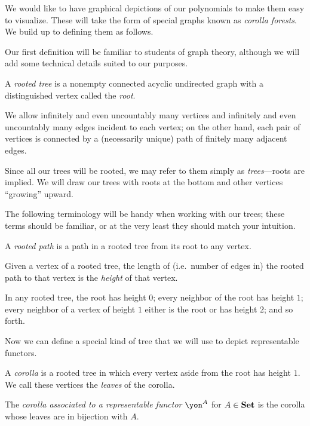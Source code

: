 \documentclass[Book-Poly]{subfiles}
\begin{document}
We would like to have graphical depictions of our polynomials to make them easy to visualize.
These will take the form of special graphs known as \emph{corolla forests}.
We build up to defining them as follows.

Our first definition will be familiar to students of graph theory, although we will add some technical details suited to our purposes.
\begin{definition}
    A \emph{rooted tree} is a nonempty connected acyclic undirected graph with a distinguished vertex called the \emph{root}.

    We allow infinitely and even uncountably many vertices and infinitely and even uncountably many edges incident to each vertex; on the other hand, each pair of vertices is connected by a (necessarily unique) path of finitely many adjacent edges.
\end{definition}
Since all our trees will be rooted, we may refer to them simply as \emph{trees}---roots are implied.
We will draw our trees with roots at the bottom and other vertices ``growing'' upward.

The following terminology will be handy when working with our trees; these terms should be familiar, or at the very least they should match your intuition.
\begin{definition}
    A \emph{rooted path} is a path in a rooted tree from its root to any vertex.

    Given a vertex of a rooted tree, the length of (i.e.\ number of edges in) the rooted path to that vertex is the \emph{height} of that vertex.
\end{definition}
In any rooted tree, the root has height $0$; every neighbor of the root has height $1$; every neighbor of a vertex of height $1$ either is the root or has height $2$; and so forth.

Now we can define a special kind of tree that we will use to depict representable functors.
\begin{definition}[Corolla]
    A \emph{corolla} is a rooted tree in which every vertex aside from the root has height $1$. We call these vertices the \emph{leaves} of the corolla.

    The \emph{corolla associated to a representable functor $\yon^A$} for $A\in\mathbf{Set}$ is the corolla whose leaves are in bijection with $A$.
\end{definition}
\end{document}
